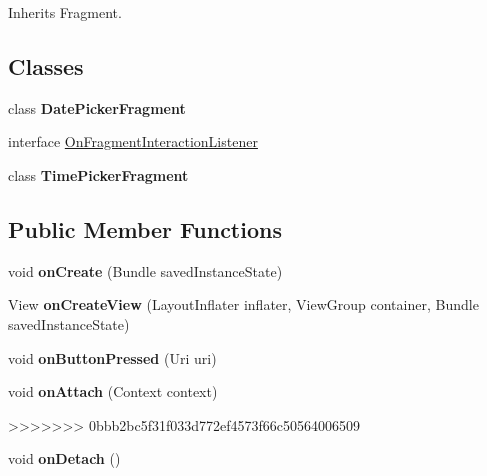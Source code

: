 \begin{DoxyCompactItemize}
\-Inherits \-Fragment.

\subsection*{\-Classes}
\begin{DoxyCompactItemize}
\item 
class {\bfseries \-Date\-Picker\-Fragment}
\item 
interface \hyperlink{interfacecom_1_1example_1_1sel_1_1lostfound_1_1PostFragment_1_1OnFragmentInteractionListener}{\-On\-Fragment\-Interaction\-Listener}
\item 
class {\bfseries \-Time\-Picker\-Fragment}
\end{DoxyCompactItemize}
\subsection*{\-Public \-Member \-Functions}
\begin{DoxyCompactItemize}
\item 
\hypertarget{classcom_1_1example_1_1sel_1_1lostfound_1_1PostFragment_a6ae53f1d4250edd39b3fab572b34a03c}{void {\bfseries on\-Create} (\-Bundle saved\-Instance\-State)}\label{classcom_1_1example_1_1sel_1_1lostfound_1_1PostFragment_a6ae53f1d4250edd39b3fab572b34a03c}

\item 
\hypertarget{classcom_1_1example_1_1sel_1_1lostfound_1_1PostFragment_a8c10184073835d28affa07720db256a4}{\-View {\bfseries on\-Create\-View} (\-Layout\-Inflater inflater, \-View\-Group container, \-Bundle saved\-Instance\-State)}\label{classcom_1_1example_1_1sel_1_1lostfound_1_1PostFragment_a8c10184073835d28affa07720db256a4}

\item 
\hypertarget{classcom_1_1example_1_1sel_1_1lostfound_1_1PostFragment_afba287683734ca9acaea52278c3e1eb5}{void {\bfseries on\-Button\-Pressed} (\-Uri uri)}\label{classcom_1_1example_1_1sel_1_1lostfound_1_1PostFragment_afba287683734ca9acaea52278c3e1eb5}

\item 
\hypertarget{classcom_1_1example_1_1sel_1_1lostfound_1_1PostFragment_af8646c233bb3c70dbb6352f8a1c60e62}{void {\bfseries on\-Attach} (\-Context context)}\label{classcom_1_1example_1_1sel_1_1lostfound_1_1PostFragment_af8646c233bb3c70dbb6352f8a1c60e62}
>>>>>>> 0bbb2bc5f31f033d772ef4573f66c50564006509

\item 
\hypertarget{classcom_1_1example_1_1sel_1_1lostfound_1_1PostFragment_ae96f353335b113be26870d00d3ac3b1c}{void {\bfseries on\-Detach} ()}\label{classcom_1_1example_1_1sel_1_1lostfound_1_1PostFragment_ae96f353335b113be26870d00d3ac3b1c}


\end{DoxyCompactItemize}
\end{DoxyCompactItemize}
